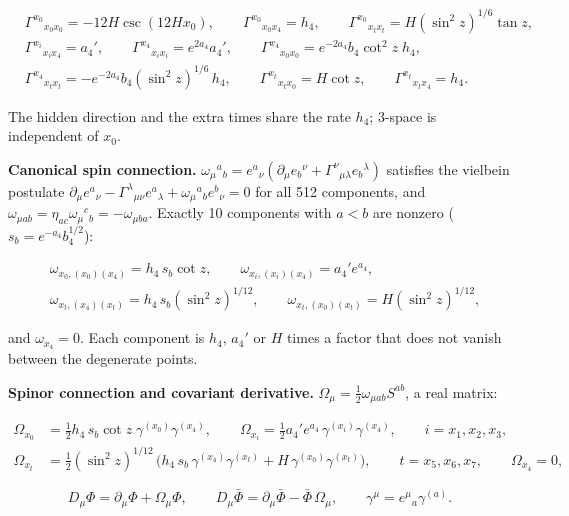 \documentclass[11pt]{article}
\begin{document}
\[
\begin{aligned}
&\Gamma^{x_0}{}_{x_0 x_0} = -12H\csc(12Hx_0), \qquad \Gamma^{x_0}{}_{x_0 x_4} = h_4, \qquad \Gamma^{x_0}{}_{x_t x_t} = H(\sin^2 z)^{1/6}\tan z, \\
&\Gamma^{x_i}{}_{x_i x_4} = a_4', \qquad \Gamma^{x_4}{}_{x_i x_i} = e^{2a_4}a_4', \qquad \Gamma^{x_4}{}_{x_0 x_0} = e^{-2a_4}b_4\cot^2 z\;h_4, \\
&\Gamma^{x_4}{}_{x_t x_t} = -e^{-2a_4}b_4(\sin^2 z)^{1/6}\,h_4, \qquad \Gamma^{x_t}{}_{x_t x_0} = H\cot z, \qquad \Gamma^{x_t}{}_{x_t x_4} = h_4 .
\end{aligned}
\]

The hidden direction and the extra times share the rate $h_4$; 3-space is independent of $x_0$.

\textbf{Canonical spin connection.} $\omega_\mu{}^a{}_b = e^a{}_\nu(\partial_\mu e_b{}^\nu + \Gamma^\nu{}_{\mu\lambda}e_b{}^\lambda)$ satisfies the vielbein postulate $\partial_\mu e^a{}_\nu - \Gamma^\lambda{}_{\mu\nu}e^a{}_\lambda + \omega_\mu{}^a{}_b e^b{}_\nu = 0$ for all 512 components, and $\omega_{\mu ab} = \eta_{ac}\omega_\mu{}^c{}_b = -\omega_{\mu ba}$. Exactly 10 components with $a < b$ are nonzero ($s_b = e^{-a_4}b_4^{1/2}$):

\[
\begin{aligned}
& \omega_{x_0,(x_0)(x_4)} = h_4\,s_b\cot z, \qquad \omega_{x_i,(x_i)(x_4)} = a_4'e^{a_4}, \\
& \omega_{x_t,(x_4)(x_t)} = h_4\,s_b(\sin^2 z)^{1/12}, \qquad \omega_{x_t,(x_0)(x_t)} = H(\sin^2 z)^{1/12} ,
\end{aligned}
\]

and $\omega_{x_4} = 0$. Each component is $h_4$, $a_4'$ or $H$ times a factor that does not vanish between the degenerate points.

\textbf{Spinor connection and covariant derivative.} $\Omega_\mu = \tfrac12\omega_{\mu ab}S^{ab}$, a real matrix:

\[
\begin{aligned}
\Omega_{x_0} &= \tfrac12 h_4\,s_b\cot z\;\gamma^{(x_0)}\gamma^{(x_4)}, \qquad \Omega_{x_i} = \tfrac12 a_4'e^{a_4}\,\gamma^{(x_i)}\gamma^{(x_4)}, \qquad i = x_1, x_2, x_3, \\
\Omega_{x_t} &= \tfrac12(\sin^2 z)^{1/12}\,\big(h_4\,s_b\,\gamma^{(x_4)}\gamma^{(x_t)} + H\,\gamma^{(x_0)}\gamma^{(x_t)}\big), \qquad t = x_5, x_6, x_7, \qquad \Omega_{x_4} = 0,
\end{aligned}
\]

\[
D_\mu\Phi = \partial_\mu\Phi + \Omega_\mu\Phi, \qquad D_\mu\bar\Phi = \partial_\mu\bar\Phi - \bar\Phi\,\Omega_\mu, \qquad \gamma^\mu = e^\mu{}_a\gamma^{(a)} .
\]
\end{document}
